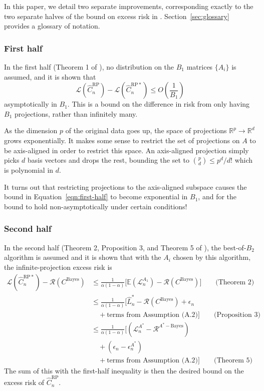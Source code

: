 \documentclass{amsart}
\newcommand\E{\mathbb{E}}
\newcommand\cbayes{C^{\mathrm{Bayes}}}
\newcommand\crpnhat{\hat{C}_{n}^{\mathrm{RP}}}
\newcommand\crpnhatstar{\hat{C}_{n}^{\mathrm{RP*}}}
\newcommand\risk{\mathcal{L}}
\newcommand\rrisk{\mathcal{R}}
\begin{document}
In this paper, we detail two separate improvements, corresponding exactly to the two separate halves of the bound on excess risk in \cite{CS15}. Section~\ref{sec:glossary} provides a glossary of notation.

\subsubsection{First half}\label{sec:first-half}

In the first half (Theorem 1 of \cite{CS15}), no distribution on the $B_1$ matrices $\{A_i\}$ is assumed, and it is shown that
\begin{equation}
\risk(\crpnhat) - \risk(\crpnhatstar) \leq O\left(\frac{1}{B_1}\right)
\label{eqn:first-half}
\end{equation}
asymptotically in $B_1$. This is a bound on the difference in risk from only having $B_1$ projections, rather than infinitely many.

As the dimension $p$ of the original data goes up, the space of projections $\mathbb{R}^p\to\mathbb{R}^d$ grows exponentially. It makes some sense to restrict the set of projections on $A$ to be axis-aligned in order to restrict this space. An axis-aligned projection simply picks $d$ basis vectors and drops the rest, bounding the set to $\binom{p}{d}\leq p^{d}/d!$ which is polynomial in $d$.

It turns out that restricting projections to the axis-aligned subspace causes the bound in Equation~\ref{eqn:first-half} to become exponential in $B_1$, and for the bound to hold non-asymptotically under certain conditions!

\subsubsection{Second half}\label{sec:second-half}

In the second half (Theorem 2, Proposition 3, and Theorem 5 of \cite{CS15}), the best-of-$B_2$ algorithm is assumed and it is shown that with the $A_i$ chosen by this algorithm, the infinite-projection excess risk is 
\begin{align*}
\risk(\crpnhatstar) - \rrisk(\cbayes)
	&\leq \frac1{\alpha(1-\alpha)}\big[
			\E(\risk_n^{A_1})-\rrisk(\cbayes)
		\big] \qquad\text{(Theorem 2)} \\
	&\leq \frac1{\alpha(1-\alpha)}\big[
			\hat{L}_n^* - \rrisk(\cbayes) + \epsilon_n \\
	&\quad	+ \text{terms from Assumption (A.2)}
		\big] \qquad\text{(Proposition 3)} \\
	&\leq \frac1{\alpha(1-\alpha)}\big[
			(\risk_n^{A^*} - \rrisk^{A^*-\mathrm{Bayes}}) \\
	&\quad	+ (\epsilon_n - \epsilon_n^{A^*}) \\
	&\quad	+ \text{terms from Assumption (A.2)}
		\big] \qquad\text{(Theorem 5)}
\end{align*}
The sum of this with the first-half inequality is then the desired bound on the excess risk of $\crpnhat$.
\end{document}
